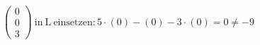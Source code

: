 \documentclass[preview]{standalone}
\begin{document}
\begin{center}
$\begin{pmatrix} 0 \\ 0 \\ 3 \end{pmatrix} \: \mathrm{in \: L \: einsetzen:} 5 \cdot (0) - (0) -3 \cdot (0) = 0 \neq -9$
\end{center}
\end{document}
